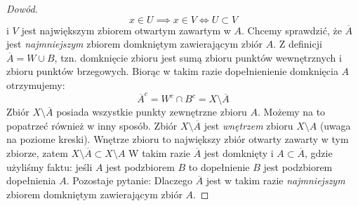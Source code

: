 \documentclass{article}
\begin{document}
\begin{proof}[Dowód]
    \begin{equation*}
        x \in U \implies x \in V \iff U \subset V
    \end{equation*}
    i \(V\) jest największym zbiorem otwartym zawartym w \(A\).
    \newline
    Chcemy sprawdzić, że \(\overline{A}\) jest \emph{najmniejszym} zbiorem domkniętym zawierającym zbiór \(A\).
    Z definicji \(\overline{A} = W \cup B\), tzn. domknięcie zbioru jest sumą zbioru punktów wewnętrznych i zbioru
    punktów brzegowych. Biorąc w takim razie dopełnienienie domknięcia \(A\) otrzymujemy:
    \begin{equation*}
        \overline{A}^{c} = W^c \cap B^c = X \setminus \overline{A}
    \end{equation*}
    Zbiór \(X \setminus \overline{A}\) posiada wszystkie punkty zewnętrzne zbioru \(A\). Możemy na to popatrzeć również
    w inny sposób. Zbiór \(X \setminus \overline{A}\) jest \emph{wnętrzem} zbioru \(X \setminus A\) (uwaga na poziome kreski).
    Wnętrze zbioru to największy zbiór otwarty zawarty w tym zbiorze, zatem \(X \setminus \overline{A} \subset X \setminus A\)
    W takim razie  \(\overline{A}\) jest domknięty i \(A \subset \overline{A}\),
    gdzie użyliśmy faktu: jeśli \(A\) jest podzbiorem \(B\) to dopełnienie \(B\) jest podzbiorem dopełnienia \(A\).
    Pozostaje pytanie: Dlaczego \(\overline{A}\) jest w takim razie \emph{najmniejszym} zbiorem domkniętym zawierającym zbiór \(A\).


\end{proof}
\end{document}
